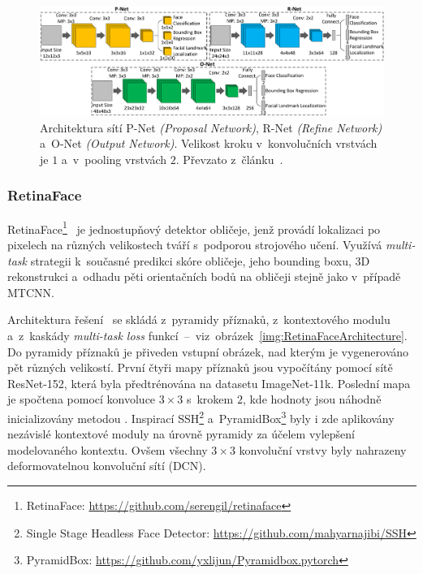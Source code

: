 \begin{figure}[hbt]
	\centering
	\setlength{\fboxsep}{0pt}
	\includegraphics[width=1.0\textwidth]{obrazky-figures/MTCNN.pdf}
	\caption{Architektura sítí P-Net \emph{(Proposal Network)}, R-Net \emph{(Refine
Network)} a~O-Net \emph{(Output Network)}. Velikost kroku v~konvolučních vrstvách je $1$ a~v~pooling vrstvách $2$. Převzato z~článku~\cite{article:MTCNN}.}
	\label{img:MTCNN}
\end{figure}

\subsubsection{RetinaFace}
RetinaFace\footnote{RetinaFace: \url{https://github.com/serengil/retinaface}}~\cite{article:RetinaFace} je jednostupňový detektor obličeje, jenž provádí lokalizaci po pixelech na různých velikostech tváří s~podporou strojového učení. Využívá \emph{multi-task} strategii k~současné predikci skóre obličeje, jeho bounding boxu, 3D rekonstrukci a~odhadu pěti orientačních bodů na obličeji stejně jako v~případě MTCNN.

Architektura řešení~\cite{article:RetinaFace, website:RetinaFace} se skládá z~pyramidy příznaků, z~kontextového modulu a~z~kaskády \emph{multi-task loss} funkcí~--~viz~obrázek~\ref{img:RetinaFaceArchitecture}. Do pyramidy příznaků je přiveden vstupní obrázek, nad kterým je vygenerováno pět různých velikostí. První čtyři mapy příznaků jsou vypočítány pomocí sítě ResNet-152, která byla předtrénována na datasetu ImageNet-11k. Poslední mapa je spočtena pomocí konvoluce $3 \times 3$ s~krokem $2$, kde hodnoty jsou náhodně inicializovány metodou \emph{}. Inspirací SSH\footnote{Single Stage Headless Face Detector: \url{https://github.com/mahyarnajibi/SSH}} a~PyramidBox\footnote{PyramidBox: \url{https://github.com/yxlijun/Pyramidbox.pytorch}} byly i zde aplikovány nezávislé kontextové moduly na úrovně pyramidy za účelem vylepšení modelovaného kontextu. Ovšem všechny $3 \times 3$ konvoluční vrstvy byly nahrazeny deformovatelnou konvoluční sítí (DCN).

